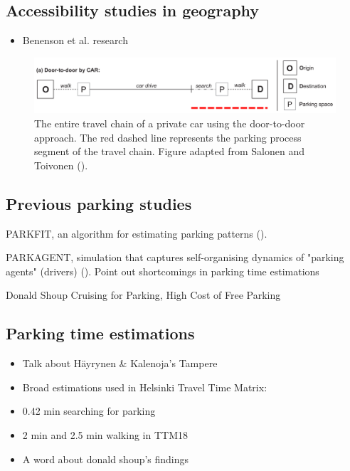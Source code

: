 \newpage
\subsection{Accessibility studies in geography}
\justify

\begin{itemize}
  \item Benenson et al. research
\end{itemize}

\begin{figure}[H]%
    \includegraphics[width=\textwidth]{images/door2door.png}
    \caption[Door-to-door approach]{The entire travel chain of a private car using the door-to-door approach. The red dashed line represents the parking process segment of the travel chain. Figure adapted from Salonen and Toivonen (\citeyear{Salonen2013}).}%
    \label{fig:door-to-door}%
\end{figure}

\newpage
\subsection{Previous parking studies}
\justify

PARKFIT, an algorithm for estimating parking patterns (\cite{Levy2015}).

PARKAGENT, simulation that captures self-organising dynamics of "parking agents" (drivers) (\cite{Benenson2008}). Point out shortcomings in parking time estimations

Donald Shoup Cruising for Parking, High Cost of Free Parking

\newpage
\subsection{Parking time estimations}
\justify

\begin{itemize}
  \item Talk about Häyrynen \& Kalenoja's Tampere
  \item Broad estimations used in Helsinki Travel Time Matrix:
  \item 0.42 min searching for parking
  \item 2 min and 2.5 min walking in TTM18
  \item A word about donald shoup's findings
\end{itemize}

